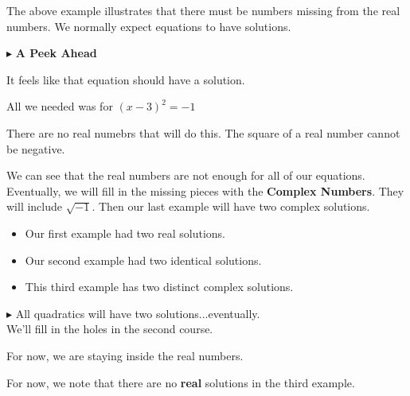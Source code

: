 \documentclass{ximera}
\begin{document}
The above example illustrates that there must be numbers missing from the real numbers.  We normally expect equations to have solutions. 


$\blacktriangleright$  \textbf{\textcolor{purple!85!blue}{A Peek Ahead}} 



It feels like that equation should have a solution.  


All we needed was for $(x-3)^2 = -1$ 

There are no real numebrs that will do this.  The square of a real number cannot be negative. 




We can see that the real numbers are not enough for all of our equations.  Eventually, we will fill in the missing pieces with the \textbf{Complex Numbers}.  They will include $\sqrt{-1}$.  Then our last example will have two complex solutions.  


\begin{itemize}
\item Our first example had two real solutions.  
\item Our second example had two identical solutions.  
\item This third example has two distinct complex solutions. 
\end{itemize}



$\blacktriangleright$ All quadratics will have two solutions...eventually. \\

We'll fill in the holes in the second course.









For now, we are staying inside the real numbers.



For now, we note that there are no \textbf{real} solutions in the third example.
\end{document}
